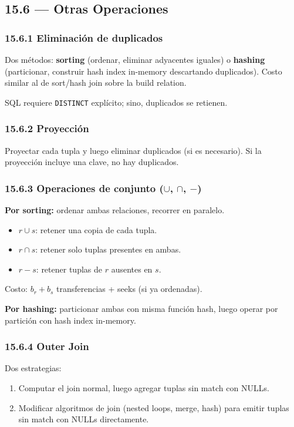\documentclass[11pt, a4paper]{article}
\begin{document}
\subsection{15.6 --- Otras Operaciones}

\subsubsection{15.6.1 Eliminación de duplicados}
Dos métodos: \textbf{sorting} (ordenar, eliminar adyacentes iguales) o \textbf{hashing} (particionar, construir hash index in-memory descartando duplicados). Costo similar al de sort/hash join sobre la build relation.

SQL requiere \texttt{DISTINCT} explícito; sino, duplicados se retienen.

\subsubsection{15.6.2 Proyección}
Proyectar cada tupla y luego eliminar duplicados (si es necesario). Si la proyección incluye una clave, no hay duplicados.

\subsubsection{15.6.3 Operaciones de conjunto ($\cup$, $\cap$, $-$)}

\textbf{Por sorting:} ordenar ambas relaciones, recorrer en paralelo.
\begin{itemize}[nosep]
	\item $r \cup s$: retener una copia de cada tupla.
	\item $r \cap s$: retener solo tuplas presentes en ambas.
	\item $r - s$: retener tuplas de $r$ ausentes en $s$.
\end{itemize}
Costo: $b_r + b_s$ transferencias + seeks (si ya ordenadas).

\textbf{Por hashing:} particionar ambas con misma función hash, luego operar por partición con hash index in-memory.

\subsubsection{15.6.4 Outer Join}
Dos estrategias:
\begin{enumerate}[nosep]
	\item Computar el join normal, luego agregar tuplas sin match con NULLs.
	\item Modificar algoritmos de join (nested loops, merge, hash) para emitir tuplas sin match con NULLs directamente.
\end{enumerate}
\end{document}
